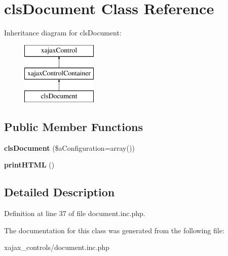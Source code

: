 \hypertarget{classclsDocument}{
\section{clsDocument Class Reference}
\label{classclsDocument}
}
Inheritance diagram for clsDocument:\begin{figure}[H]
\begin{center}
\leavevmode
\includegraphics[height=3.000000cm]{classclsDocument}
\end{center}
\end{figure}
\subsection*{Public Member Functions}
\begin{DoxyCompactItemize}
\item 
\hypertarget{classclsDocument_a22b4994dc5739e02333c4974994b20a7}{
{\bfseries clsDocument} (\$aConfiguration=array())}
\label{classclsDocument_a22b4994dc5739e02333c4974994b20a7}

\item 
\hypertarget{classclsDocument_ad20d8a7c5539a351469ee98f98a88978}{
{\bfseries printHTML} ()}
\label{classclsDocument_ad20d8a7c5539a351469ee98f98a88978}

\end{DoxyCompactItemize}


\subsection{Detailed Description}


Definition at line 37 of file document.inc.php.



The documentation for this class was generated from the following file:\begin{DoxyCompactItemize}
\item 
xajax\_\-controls/document.inc.php\end{DoxyCompactItemize}
